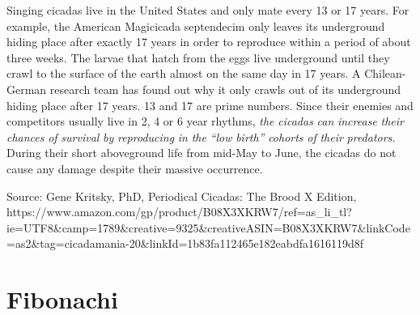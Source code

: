 \documentclass[11pt]{article}
\begin{document}
Singing cicadas live in the United States and only mate every 13 or 17
years. For example, the American Magicicada septendecim only leaves its
underground hiding place after exactly 17 years in order to reproduce
within a period of about three weeks. The larvae that hatch from the
eggs live underground until they crawl to the surface of the earth
almost on the same day in 17 years. A Chilean-German research team has
found out why it only crawls out of its underground hiding place after
17 years. 13 and 17 are prime numbers. Since their enemies and
competitors usually live in 2, 4 or 6 year rhythms, \emph{the}
\emph{cicadas} \emph{can} \emph{increase} \emph{their} \emph{chances}
\emph{of} \emph{survival} \emph{by} \emph{reproducing} \emph{in}
\emph{the} \emph{``low} \emph{birth''} \emph{cohorts} \emph{of}
\emph{their} \emph{predators.} During their short aboveground life from
mid-May to June, the cicadas do not cause any damage despite their
massive occurrence.

Source: Gene Kritsky, PhD, Periodical Cicadas: The Brood X Edition,
https://www.amazon.com/gp/product/B08X3XKRW7/ref=as\_li\_tl?ie=UTF8\&camp=1789\&creative=9325\&creativeASIN=B08X3XKRW7\&linkCode=as2\&tag=cicadamania-20\&linkId=1b83fa112465e182eabdfa1616119d8f

    \hypertarget{fibonachi}{%
\section{Fibonachi}\label{fibonachi}}
\end{document}
